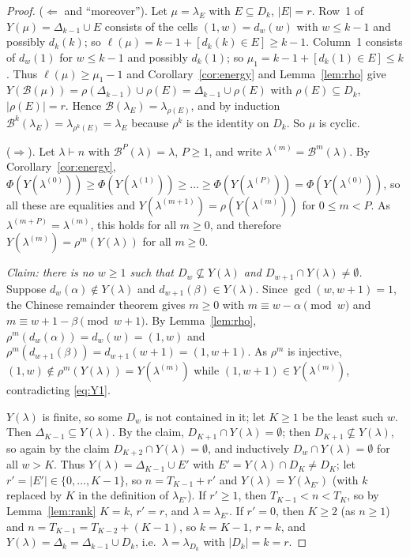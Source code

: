 \documentclass[11pt]{article}
\theoremstyle{definition}
\newcommand{\B}{\mathcal{B}}
\renewcommand{\le}{\leqslant}
\renewcommand{\ge}{\geqslant}
\begin{document}
\begin{proof}
($\Leftarrow$ and ``moreover'').  Let $\mu=\lambda_E$ with $E\subseteq D_k$, $|E|=r$.  Row~1 of
$Y(\mu)=\Delta_{k-1}\cup E$ consists of the cells $(1,w)=d_w(w)$ with $w\le k-1$ and possibly $d_k(k)$;
so $\ell(\mu)=k-1+[d_k(k)\in E]\ge k-1$.  Column~1 consists of $d_w(1)$ for $w\le k-1$ and possibly $d_k(1)$;
so $\mu_1=k-1+[d_k(1)\in E]\le k$.  Thus $\ell(\mu)\ge\mu_1-1$ and Corollary~\ref{cor:energy} and
Lemma~\ref{lem:rho} give $Y(\B(\mu))=\rho(\Delta_{k-1})\cup\rho(E)=\Delta_{k-1}\cup\rho(E)$ with
$\rho(E)\subseteq D_k$, $|\rho(E)|=r$.  Hence $\B(\lambda_E)=\lambda_{\rho(E)}$, and by induction
$\B^k(\lambda_E)=\lambda_{\rho^k(E)}=\lambda_E$ because $\rho^k$ is the identity on $D_k$.  So $\mu$ is cyclic.

($\Rightarrow$).  Let $\lambda\vdash n$ with $\B^P(\lambda)=\lambda$, $P\ge 1$, and write
$\lambda^{(m)}=\B^m(\lambda)$.  By Corollary~\ref{cor:energy},
$\Phi(Y(\lambda^{(0)}))\ge\Phi(Y(\lambda^{(1)}))\ge\dots\ge\Phi(Y(\lambda^{(P)}))=\Phi(Y(\lambda^{(0)}))$, so all these are
equalities and $Y(\lambda^{(m+1)})=\rho(Y(\lambda^{(m)}))$ for $0\le m<P$.  As $\lambda^{(m+P)}=\lambda^{(m)}$, this holds for
all $m\ge0$, and therefore $Y(\lambda^{(m)})=\rho^m(Y(\lambda))$ for all $m\ge 0$.

\emph{Claim: there is no $w\ge1$ such that $D_w\not\subseteq Y(\lambda)$ and $D_{w+1}\cap Y(\lambda)\ne\emptyset$.}
Suppose $d_w(\alpha)\notin Y(\lambda)$ and $d_{w+1}(\beta)\in Y(\lambda)$.  Since $\gcd(w,w+1)=1$, the Chinese remainder
theorem gives $m\ge0$ with $m\equiv w-\alpha\pmod w$ and $m\equiv w+1-\beta\pmod{w+1}$.  By Lemma~\ref{lem:rho},
$\rho^m(d_w(\alpha))=d_w(w)=(1,w)$ and $\rho^m(d_{w+1}(\beta))=d_{w+1}(w+1)=(1,w+1)$.  As $\rho^m$ is injective,
$(1,w)\notin\rho^m(Y(\lambda))=Y(\lambda^{(m)})$ while $(1,w+1)\in Y(\lambda^{(m)})$, contradicting \eqref{eq:Y1}.

$Y(\lambda)$ is finite, so some $D_w$ is not contained in it; let $K\ge1$ be the least such $w$.  Then
$\Delta_{K-1}\subseteq Y(\lambda)$.  By the claim, $D_{K+1}\cap Y(\lambda)=\emptyset$; then $D_{K+1}\not\subseteq Y(\lambda)$, so
again by the claim $D_{K+2}\cap Y(\lambda)=\emptyset$, and inductively $D_w\cap Y(\lambda)=\emptyset$ for all $w>K$.  Thus
$Y(\lambda)=\Delta_{K-1}\cup E'$ with $E'=Y(\lambda)\cap D_K\ne D_K$; let $r'=|E'|\in\{0,\dots,K-1\}$, so
$n=T_{K-1}+r'$ and $Y(\lambda)=Y(\lambda_{E'})$ (with $k$ replaced by $K$ in the definition of $\lambda_{E'}$).
If $r'\ge1$, then $T_{K-1}<n<T_K$, so by Lemma~\ref{lem:rank} $K=k$, $r'=r$, and $\lambda=\lambda_{E'}$.
If $r'=0$, then $K\ge2$ (as $n\ge1$) and $n=T_{K-1}=T_{K-2}+(K-1)$, so $k=K-1$, $r=k$, and
$Y(\lambda)=\Delta_k=\Delta_{k-1}\cup D_k$, i.e.\ $\lambda=\lambda_{D_k}$ with $|D_k|=k=r$.
\end{proof}
\end{document}
